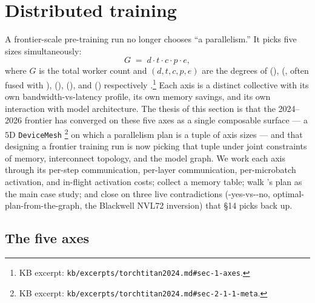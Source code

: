 
\section{Distributed training}
\label{sec:distributed-training}

A frontier-scale pre-training run no longer chooses ``a parallelism.''
It picks five sizes simultaneously:
\begin{equation}
G \;=\; d \cdot t \cdot c \cdot p \cdot e,
\label{eq:5d-mesh}
\end{equation}
where $G$ is the total worker count and $(d, t, c, p, e)$ are the
degrees of \emph{} (), \emph{} (, often
fused with ), \emph{} (),
\emph{} (), and \emph{} ()
respectively \citep[\S 1]{torchtitan2024}.\footnote{KB excerpt:
\nolinkurl{kb/excerpts/torchtitan2024.md#sec-1-axes}.} Each axis is a
distinct collective with its own bandwidth-vs-latency profile, its own
memory savings, and its own interaction with model architecture. The
thesis of this section is that the 2024--2026 frontier has converged
on these five axes as a single composable surface --- a $5$D
\texttt{DeviceMesh} \citep[\S 2.1.1]{torchtitan2024}\footnote{KB
excerpt: \nolinkurl{kb/excerpts/torchtitan2024.md#sec-2-1-1-meta}.} on
which a parallelism plan is a tuple of axis sizes --- and that
designing a frontier training run is now picking that tuple under
joint constraints of memory, interconnect topology, and the model
graph. We work each axis through its per-step communication, per-layer
communication, per-microbatch activation, and in-flight activation
costs; collect a memory table; walk 's plan as the
main case study; and close on three live contradictions
(-yes-vs--no, optimal-plan-from-the-graph, the Blackwell NVL72
inversion) that §14 picks back up.

\subsection{The five axes}
\label{sec:dt-axes}

